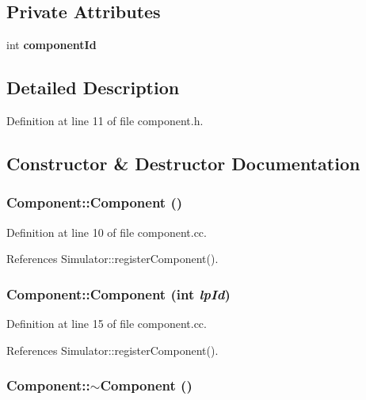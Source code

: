 \subsection*{Private Attributes}
\begin{CompactItemize}
\item 
int {\bf componentId}
\end{CompactItemize}


\subsection{Detailed Description}


Definition at line 11 of file component.h.

\subsection{Constructor \& Destructor Documentation}
\subsubsection[{Component}]{\setlength{\rightskip}{0pt plus 5cm}Component::Component ()}\label{classComponent_8775db6d1a2c1afc2e77cd3c8f39da6f}




Definition at line 10 of file component.cc.

References Simulator::registerComponent().
\subsubsection[{Component}]{\setlength{\rightskip}{0pt plus 5cm}Component::Component (int {\em lpId})}\label{classComponent_52f5a349d8ed4bd7efd4c8ee381a0ed8}




Definition at line 15 of file component.cc.

References Simulator::registerComponent().
\subsubsection[{$\sim$Component}]{\setlength{\rightskip}{0pt plus 5cm}Component::$\sim$Component ()}\label{classComponent_b8378fa275af98e568a7e91d33d867af}




